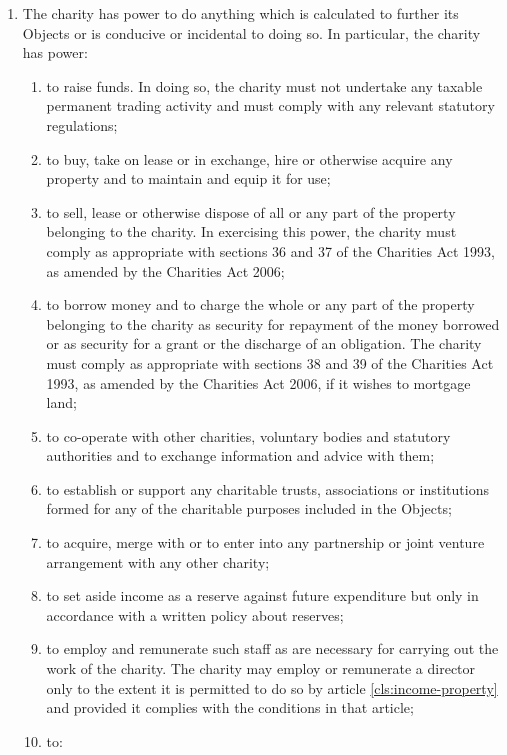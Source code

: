 \begin{enumerate}
\item
  The charity has power to do anything which is calculated to further
  its Objects or is conducive or incidental to doing so. In
  particular, the charity has power:
  \begin{enumerate}
  \item
    to raise funds. In doing so, the charity must not undertake any
    taxable permanent trading activity and must comply with any
    relevant statutory regulations;
  \item
    to buy, take on lease or in exchange, hire or otherwise acquire any
    property and to maintain and equip it for use;
  \item
    to sell, lease or otherwise dispose of all or any part of the
    property belonging to the charity. In exercising this power, the
    charity must comply as appropriate with sections 36 and 37 of the
    Charities Act 1993, as amended by the Charities Act 2006;
  \item
    to borrow money and to charge the whole or any part of the property
    belonging to the charity as security for repayment of the money
    borrowed or as security for a grant or the discharge of an
    obligation. The charity must comply as appropriate with sections 38
    and 39 of the Charities Act 1993, as amended by the Charities Act
    2006, if it wishes to mortgage land;
  \item
    to co-operate with other charities, voluntary bodies and statutory
    authorities and to exchange information and advice with them;
  \item
    to establish or support any charitable trusts, associations or
    institutions formed for any of the charitable purposes included in
    the Objects;
  \item
    to acquire, merge with or to enter into any partnership or joint
    venture arrangement with any other charity;
  \item
    to set aside income as a reserve against future expenditure but
    only in accordance with a written policy about reserves;
  \item
    to employ and remunerate such staff as are necessary for carrying
    out the work of the charity. The charity may employ or remunerate a
    director only to the extent it is permitted to do so by article \ref{cls:income-property}
    and provided it complies with the conditions in that article;
  \item
    to:
    \begin{enumerate}

\end{enumerate}
\end{enumerate}
\end{enumerate}
